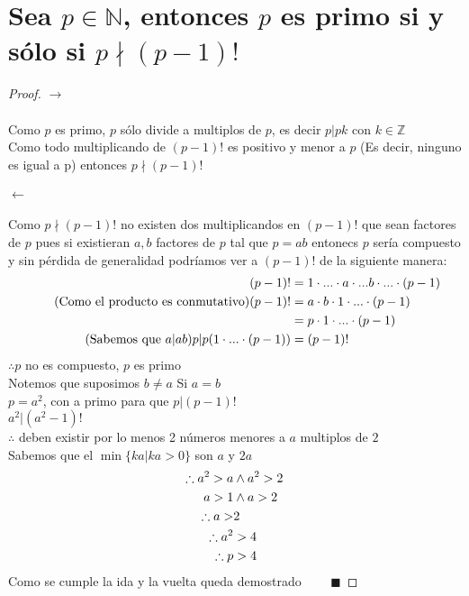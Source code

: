 \section{Sea $p \in \mathbb{N}$, entonces $p$ es primo si y sólo si $p \nmid (p−1)!$}
    \begin{proof}
        $\rightarrow$ \\ \\
        Como $p$ es primo, $p$ sólo divide a multiplos de $p$, es decir $p|pk$ con $k \in \mathbb{Z}$ \\
        Como todo multiplicando de $(p-1)!$ es positivo y menor a $p$ (Es decir, ninguno es igual a p) entonces $p\nmid (p-1)!$ \\
        \\ $\leftarrow$ \\ \\
        Como $p\nmid (p-1)!$ no existen dos multiplicandos en $(p-1)!$ que sean factores de $p$ pues si existieran $a,b$ factores de $p$ tal que $p=ab$ entonecs $p$ sería compuesto y sin pérdida de generalidad podríamos ver a $(p-1)!$ de la siguiente manera: 
        \begin{align}
            \notag (p-1)! &= 1\cdot ... \cdot a \cdot ... b \cdot ... \cdot (p-1) \\
            \tag{Como el producto es conmutativo} (p-1)! &= a\cdot b \cdot 1 \cdot   ... \cdot (p-1) \\
            \notag &= p \cdot 1 \cdot ... \cdot (p-1) \\
            \tag{Sabemos que $a|ab$} p|p(1\cdot ... \cdot (p-1)) &= (p-1)!
        \end{align}
        $\therefore p$ no es compuesto, $p$ es primo \\
        Notemos que suposimos $b \neq a$
        Si $a=b$ \\
        $p = a^2$, con a primo para que $p|(p-1)!$ \\
        $a^2|(a^2-1)!$ \\
        $\therefore$ deben existir por lo menos 2 números menores a $a$ multiplos de $2$ \\
        Sabemos que el $\min\{ka|ka>0\}$ son $a$ y $2a$
        \begin{align}
            \notag \therefore a^2 > a &\wedge a^2>2 \\
            \notag a > 1 &\wedge a >2 \\
            \notag \therefore a >& 2 \\
            \notag \therefore a^2 &> 4 \\
            \notag \therefore p &> 4
        \end{align}
        Como se cumple la ida y la vuelta queda demostrado $\qquad \blacksquare$
    \end{proof}